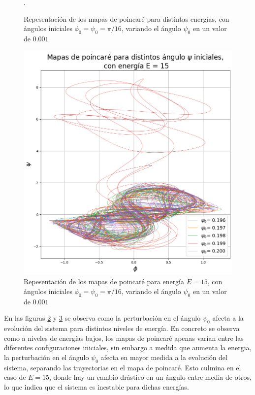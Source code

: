 \documentclass[11pt, twoside]{article} %
\begin{document}
\begin{figure}
\begin{subfigure}{.5\textwidth}
        \label{fig:poincare_estabilidad_E_10}
      \end{subfigure}
    \caption{Repesentación de los mapas de poincaré para distintas energías, con
    ángulos iniciales $\phi_0 = \psi_0 = \pi/16$, variando el ángulo $\psi_0$ en
    un valor de $0.001$}.
    \label{fig:poincare_estabilidad_E}
\end{figure}
    
\begin{figure}[h!]
    \centering
    \includegraphics[width=0.75\linewidth]{plots/poincare_estabilidad_E_15.png}
    \caption{Repesentación de los mapas de poincaré para energía $E = 15$, con
    ángulos iniciales $\phi_0 = \psi_0 = \pi/16$, variando el ángulo $\psi_0$ en
    un valor de $0.001$}
    \label{fig:poincare_estabilidad_E_15}
\end{figure}

En las figuras \ref{fig:poincare_estabilidad_E} y \ref{fig:poincare_estabilidad_E_15} 
se observa como la perturbación en el ángulo $\psi_0$ afecta a la evolución 
del sistema para distintos niveles de energía. En concreto se observa como 
a niveles de energías bajos, los mapas de poincaré apenas varían entre las
diferentes configuraciones iniciales, sin embargo a medida que aumenta la
energia, la perturbación en el ángulo $\psi_0$ afecta en mayor medida a la
evolución del sistema, separando las trayectorias en el mapa de poincaré. 
Esto culmina en el caso de $E = 15$, donde hay un cambio drástico en un ángulo
entre media de otros, lo que indica que el sistema es inestable para dichas 
energías.
\end{document}
